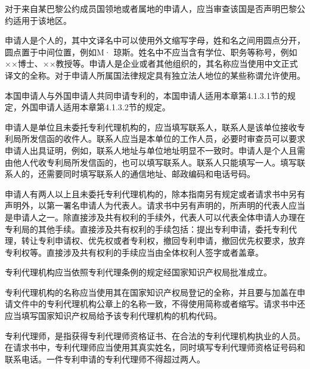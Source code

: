 对于来自某巴黎公约成员国领地或者属地的申请人，应当审查该国是否声明巴黎公约适用于该地区。

申请人是个人的，其中文译名中可以使用外文缩写字母，姓和名之间用圆点分开，圆点置于中间位置，例如M· 琼斯。姓名中不应当含有学位、职务等称号，例如××博士、××教授等。申请人是企业或者其他组织的，其名称应当使用中文正式译文的全称。对于申请人所属国法律规定具有独立法人地位的某些称谓允许使用。

本国申请人与外国申请人共同申请专利的，本国申请人适用本章第4.1.3.1节的规定，外国申请人适用本章第4.1.3.2节的规定。

申请人是单位且未委托专利代理机构的，应当填写联系人，联系人是该单位接收专利局所发信函的收件人。联系人应当是本单位的工作人员，必要时审查员可以要求申请人出具证明，例如，联系人地址与单位地址明显不一致时。申请人是个人且需由他人代收专利局所发信函的，也可以填写联系人。联系人只能填写一人。填写联系人的，还需要同时填写联系人的通信地址、邮政编码和电话号码。

申请人有两人以上且未委托专利代理机构的，除本指南另有规定或者请求书中另有声明外，以第一署名申请人为代表人。请求书中另有声明的，所声明的代表人应当是申请人之一。除直接涉及共有权利的手续外，代表人可以代表全体申请人办理在专利局的其他手续。直接涉及共有权利的手续包括：提出专利申请，委托专利代理，转让专利申请权、优先权或者专利权，撤回专利申请，撤回优先权要求，放弃专利权等。直接涉及共有权利的手续应当由全体权利人签字或者盖章。

专利代理机构应当依照专利代理条例的规定经国家知识产权局批准成立。

专利代理机构的名称应当使用其在国家知识产权局登记的全称，并且要与加盖在申请文件中的专利代理机构公章上的名称一致，不得使用简称或者缩写。请求书中还应当填写国家知识产权局给予该专利代理机构的机构代码。

专利代理师，是指获得专利代理师资格证书、在合法的专利代理机构执业的人员。在请求书中，专利代理师应当使用其真实姓名，同时填写专利代理师资格证号码和联系电话。一件专利申请的专利代理师不得超过两人。


